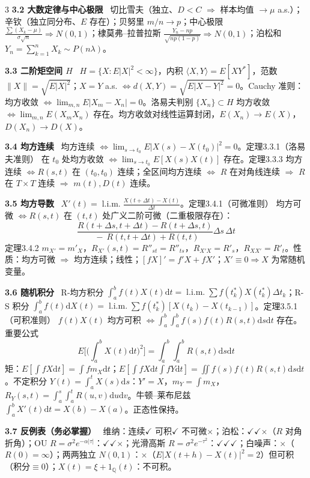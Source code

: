 \documentclass[UTF8,a4paper]{ctexart}
\newcommand{\T}[1]{{\bfseries #1}\ }
\newcommand{\Hi}[1]{\textcolor{red!70!black}{#1}}
\newcommand{\dd}{\mathrm{d}}
\newcommand{\lima}{\mathop{\mathrm{l.i.m.}}}
\begin{document}
\begin{multicols}{3}
\T{3.2 大数定律与中心极限} 切比雪夫（独立、$D<C$ $\Rightarrow$ 样本均值 $\to\mu$ a.s.）；辛钦（独立同分布、$E$ 存在）；贝努里 $m/n\to p$；\Hi{中心极限 $\frac{\sum(X_k-\mu)}{\sigma\sqrt n}\Rightarrow N(0,1)$}；棣莫弗--拉普拉斯 $\frac{Y_n-np}{\sqrt{np(1-p)}}\Rightarrow N(0,1)$；泊松和 $Y_n=\sum_{k=1}^nX_k\sim P(n\lambda)$。

\T{3.3 二阶矩空间 $H$} $H=\{X:E|X|^2<\infty\}$，内积 $\langle X,Y\rangle=E[XY^*]$，范数 $\|X\|=\sqrt{E|X|^2}$；\Hi{$X=Y$ a.s. $\iff d(X,Y)=\sqrt{E|X-Y|^2}=0$}。Cauchy 准则：均方收敛 $\iff\lim_{m,n}E|X_m-X_n|=0$。\Hi{洛易夫判别} $\{X_n\}\subset H$ 均方收敛 $\iff\lim_{m,n}E(X_mX_n)$ 存在。均方收敛对线性运算封闭，$E(X_n)\to E(X)$，$D(X_n)\to D(X)$。

\T{3.4 均方连续} 均方连续 $\iff\lim_{s\to t_0}E|X(s)-X(t_0)|^2=0$。\Hi{定理3.3.1（洛易夫准则）} 在 $t_0$ 处均方收敛 $\iff\lim_{s\to t_0}E[X(s)X(t)]$ 存在。\Hi{定理3.3.3} 均方连续 $\iff R(s,t)$ 在 $(t_0,t_0)$ 连续；全区间均方连续 $\iff$ $R$ 在对角线连续 $\Rightarrow$ $R$ 在 $T\times T$ 连续 $\Rightarrow$ $m(t),D(t)$ 连续。

\T{3.5 均方导数} $X'(t)=\lima\frac{X(t+\Delta t)-X(t)}{\Delta t}$。\Hi{定理3.4.1（可微准则）} 均方可微 $\iff R(s,t)$ 在 $(t,t)$ 处\Hi{广义二阶可微}（二重极限存在）：
$$\frac{R(t+\Delta s,t+\Delta t)-R(t+\Delta s,t)}{\ \ -\ R(t,t+\Delta t)+R(t,t)}{\Delta s\,\Delta t}$$
\Hi{定理3.4.2} $m_{X'}=m'_X$，$R_{X'}(s,t)=R''_{st}=R''_{ts}$，$R_{X'X}=R'_s$，$R_{XX'}=R'_t$。性质：均方可微 $\Rightarrow$ 均方连续；线性；$[fX]'=f'X+fX'$；$X'\equiv0\Rightarrow X$ 为常随机变量。

\T{3.6 随机积分} R-均方积分 $\int_a^bf(t)X(t)\dd t=\lima\sum f(t_k^*)X(t_k^*)\Delta t_k$；R-S 积分 $\int_a^bf(t)\dd X(t)=\lima\sum f(t_k^*)[X(t_k)-X(t_{k-1})]$。\Hi{定理3.5.1（可积准则）} $f(t)X(t)$ 均方可积 $\iff\int_a^b\!\int_a^bf(s)f(t)R(s,t)\dd s\dd t$ 存在。\Hi{重要公式}
$$E\Big[\Big(\int_a^bX(t)\dd t\Big)^2\Big]=\int_a^b\!\!\int_a^bR(s,t)\dd s\dd t$$
矩：$E[\int fX\dd t]=\int fm_X\dd t$；\allowbreak $E[\int fX\dd t\int fY\dd t]=\iint f(s)f(t)R(s,t)\dd s\dd t$。不定积分 $Y(t)=\int_a^tX(s)\dd s$：$Y'=X$，$m_Y=\int m_X$，$R_Y(s,t)=\int_a^s\!\int_a^tR(u,v)\dd u\dd v$。\Hi{牛顿--莱布尼兹 $\int_a^bX'(t)\dd t=X(b)-X(a)$}。正态性保持。

\T{3.7 反例表（务必掌握）} 维纳：连续$\checkmark$ 可积$\checkmark$ 不可微$\times$；泊松：$\checkmark$$\checkmark$$\times$（$R$ 对角折角）；OU $R=\sigma^2e^{-\alpha|\tau|}$：$\checkmark$$\checkmark$$\times$；光滑高斯 $R=\sigma^2e^{-\tau^2}$：$\checkmark$$\checkmark$$\checkmark$；白噪声：$\times$（$R(0)=\infty$）；两两独立 $N(0,1)$：$\times$（$E|X(t+h)-X(t)|^2=2$）但可积（积分$\equiv0$）；$X(t)=\xi+1_{\mathbb Q}(t)$：不可积。


\end{multicols}
\end{document}
